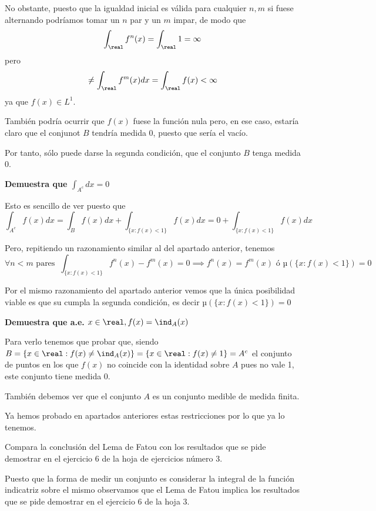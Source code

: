 \begin{problem}[15]
No obstante, puesto que la igualdad inicial es válida para cualquier $n,m$ si fuese alternando podríamos tomar un $n$ par y un $m$ impar, de modo que
\[\int_{\real}f^n(x)=\int_{\real}1=\infty\]
pero
\[\neq\int_{\real}f^m(x)dx=\int_{\real}f(x) < \infty\]
ya que $f(x) \in L^1$.

También podría ocurrir que $f(x)$ fuese la función nula pero, en ese caso, estaría claro que el conjunot $B$ tendría medida 0, puesto que sería el vacío.

Por tanto, sólo puede darse la segunda condición, que el conjunto $B$ tenga medida 0.

\spart
\textbf{Demuestra que $\int_{A^c}dx = 0$}

Esto es sencillo de ver puesto que
\[\int_{A^c}f(x) dx = \int_B f(x)dx + \int_{\{x: f(x)<1\}} f(x)dx = 0 + \int_{\{x: f(x)<1\}} f(x)dx\]

Pero, repitiendo un razonamiento similar al del apartado anterior, tenemos
\[\forall n<m \text{ pares } \ \int_{\{x: f(x)<1\}} f^n(x)-f^m(x) = 0 \implies f^n(x)=f^m(x) \text{ ó } µ(\{x: f(x)<1\}) = 0\]

Por el mismo razonamiento del apartado anterior vemos que la única posibilidad viable es que su cumpla la segunda condición, es decir $µ(\{x: f(x)<1\}) = 0$


\textbf{Demuestra que a.e. $x\in\real, f(x)=\ind_A(x)$}

Para verlo tenemos que probar que, siendo $B=\{x\in\real: f(x) \neq \ind_A(x)\} = \{x\in\real: f(x) \neq 1\} = A^c$ el conjunto de puntos en los que $f(x)$ no coincide con la identidad sobre $A$ pues no vale 1, este conjunto tiene medida 0.

También debemos ver que el conjunto $A$ es un conjunto medible de medida finita.

Ya hemos probado en apartados anteriores estas restricciones por lo que ya lo tenemos.

\end{problem}


\begin{problem}[16]
Compara la conclusión del Lema de Fatou con los resultados que se pide demostrar en el ejercicio 6 de la hoja de ejercicios número 3.

\solution

Puesto que la forma de medir un conjunto es considerar la integral de la función indicatriz sobre el mismo observamos que el Lema de Fatou implica los resultados que se pide demostrar en el ejercicio 6 de la hoja 3.
\end{problem}

